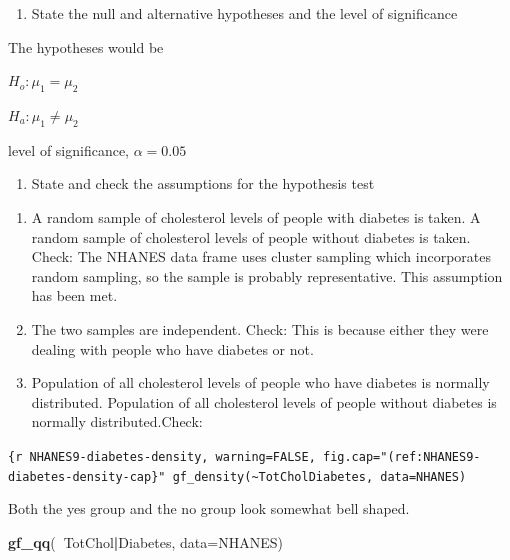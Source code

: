 \documentclass[]{book}
\newenvironment{Shaded}{\begin{snugshade}}{\end{snugshade}}
\newcommand{\DataTypeTok}[1]{\textcolor[rgb]{0.13,0.29,0.53}{#1}}
\newcommand{\KeywordTok}[1]{\textcolor[rgb]{0.13,0.29,0.53}{\textbf{#1}}}
\newcommand{\NormalTok}[1]{#1}
\newcommand{\OperatorTok}[1]{\textcolor[rgb]{0.81,0.36,0.00}{\textbf{#1}}}
\providecommand{\tightlist}{%
  \setlength{\itemsep}{0pt}\setlength{\parskip}{0pt}}
\begin{document}
\begin{enumerate}
\def\labelenumi{\arabic{enumi}.}
\setcounter{enumi}{1}
\tightlist
\item
  State the null and alternative hypotheses and the level of significance
\end{enumerate}

The hypotheses would be

\(H_o: \mu_1=\mu_2\)

\(H_a: \mu_1 \ne \mu_2\)

level of significance, \(\alpha=0.05\)

\begin{enumerate}
\def\labelenumi{\arabic{enumi}.}
\setcounter{enumi}{2}
\tightlist
\item
  State and check the assumptions for the hypothesis test
\end{enumerate}

\begin{enumerate}
\def\labelenumi{\alph{enumi}.}
\item
  A random sample of cholesterol levels of people with diabetes is taken. A random sample of cholesterol levels of people without diabetes is taken. Check: The NHANES data frame uses cluster sampling which incorporates random sampling, so the sample is probably representative. This assumption has been met.
\item
  The two samples are independent. Check: This is because either they were dealing with people who have diabetes or not.
\item
  Population of all cholesterol levels of people who have diabetes is normally distributed. Population of all cholesterol levels of people without diabetes is normally distributed.Check:
\end{enumerate}



\texttt{\{r\ NHANES9-diabetes-density,\ warning=FALSE,\ fig.cap="(ref:NHANES9-diabetes-density-cap\}"\ gf\_density(\textasciitilde{}TotChol\textbar{}Diabetes,\ data=NHANES)}

Both the yes group and the no group look somewhat bell shaped.



\begin{Shaded}
\begin{Highlighting}[]
\KeywordTok{gf_qq}\NormalTok{(}\OperatorTok{~}\NormalTok{TotChol}\OperatorTok{|}\NormalTok{Diabetes, }\DataTypeTok{data=}\NormalTok{NHANES)}
\end{Highlighting}
\end{Shaded}
\end{document}
